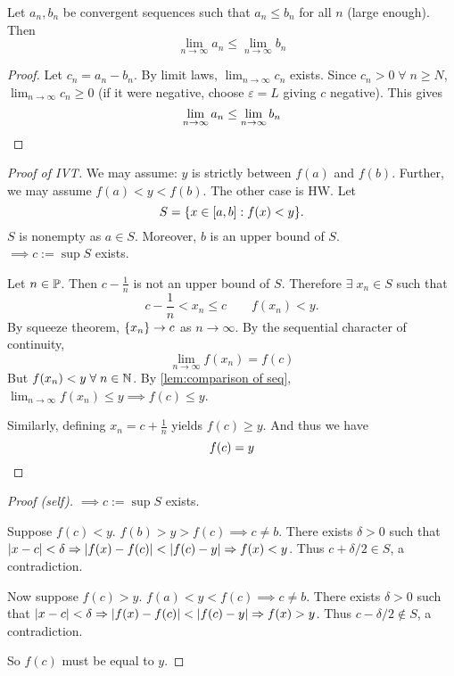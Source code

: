 \documentclass[12pt]{article}
\begin{document}
\begin{lem} \label{lem:comparison of seq}
    Let $a_{n}, b_{n}$ be convergent sequences such that $a_{n} \leq b_{n}$ for all $n$ (large enough). Then \[
        \lim_{n \to \infty} a_{n} \leq \lim_{n \to \infty} b_{n}
    \]
\end{lem}
\begin{proof}
    Let $c_{n} = a_{n} - b_{n}$. By limit laws, $\lim_{n \to \infty} c_{n}$ exists. Since $c_{n} > 0 \;\forall\; n \geq N$, $\lim_{n \to \infty} c_{n} \geq 0$ (if it were negative, choose $\varepsilon = L$ giving $c$ negative). This gives \[
        \lim_{n \to \infty} a_{n} \leq \lim_{n \to \infty} b_{n} \qedhere
    \]
\end{proof}

\begin{proof}[Proof of IVT]
    We may assume: $y$ is strictly between $f(a)$ and $f(b)$. Further, we may assume $f(a) < y < f(b)$. The other case is \textcolor{red!75!black}{HW}. Let \[
        S = \set{x \in [a, b]: f(x) < y}.
    \] $S$ is nonempty as $a \in S$. Moreover, $b$ is an upper bound of $S$. \\
    $\implies c := \sup S$ exists. 

    Let $n \in \P$. Then $c - \frac{1}{n}$ is not an upper bound of $S$. Therefore $\exists\; x_{n} \in S$ such that \[
        c - \frac{1}{n} < x_{n} \leq c \qquad f(x_{n}) < y.
    \] By squeeze theorem, $\set{x_{n}} \to c$ as $n \to \infty$. By the sequential character of continuity, \[
        \lim_{n \to \infty} f(x_{n}) = f(c)
    \] But $f(x_{n}) < y \;\forall\; n \in \N$. By \cref{lem:comparison of seq}, $\lim_{n \to \infty} f(x_{n}) \leq y \implies f(c) \leq y$. 

    Similarly, defining $x_{n} = c + \frac{1}{n}$ yields $f(c) \geq y$. And thus we have \[
        f(c) = y \qedhere
    \]
\end{proof}

\begin{proof}[Proof \textcolor{red!70!black}{(self)}]
    $\implies c := \sup S$ exists.

    Suppose $f(c) < y$. $f(b) > y > f(c) \implies c \neq b$. There exists $\delta > 0$ such that $\abs{ x - c } < \delta \implies \abs{ f(x) - f(c) } < \abs{ f(c) - y } \implies f(x) < y$. Thus $c + \delta/2 \in S$, a contradiction.

    Now suppose $f(c) > y$. $f(a) < y < f(c) \implies c \neq b$. There exists $\delta > 0$ such that $\abs{ x - c } < \delta \implies \abs{ f(x) - f(c) } < \abs{ f(c) - y } \implies f(x) > y$. Thus $c - \delta/2 \not\in S$, a contradiction.

    So $f(c)$ must be equal to $y$.
\end{proof}
\end{document}
